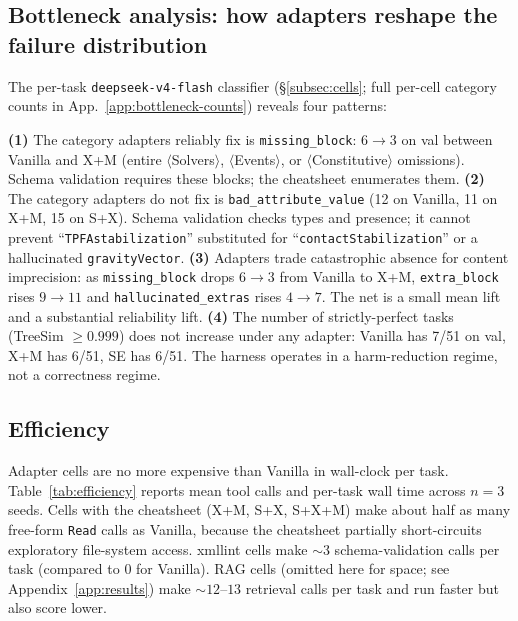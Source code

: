 \documentclass{article}
\begin{document}
\subsection{Bottleneck analysis: how adapters reshape the failure distribution}
\label{subsec:bottleneck-results}

The per-task \texttt{deepseek-v4-flash} classifier (\S\ref{subsec:cells}; full per-cell category counts in App.~\ref{app:bottleneck-counts}) reveals four patterns:

\textbf{(1)} The category adapters reliably fix is \texttt{missing\_block}: $6{\to}3$ on val between Vanilla and X+M (entire $\langle$Solvers$\rangle$, $\langle$Events$\rangle$, or $\langle$Constitutive$\rangle$ omissions). Schema validation requires these blocks; the cheatsheet enumerates them.
\textbf{(2)} The category adapters do not fix is \texttt{bad\_attribute\_value} (12 on Vanilla, 11 on X+M, 15 on S+X). Schema validation checks types and presence; it cannot prevent ``\texttt{TPFAstabilization}'' substituted for ``\texttt{contactStabilization}'' or a hallucinated \texttt{gravityVector}.
\textbf{(3)} Adapters trade catastrophic absence for content imprecision: as \texttt{missing\_block} drops $6{\to}3$ from Vanilla to X+M, \texttt{extra\_block} rises $9{\to}11$ and \texttt{hallucinated\_extras} rises $4{\to}7$. The net is a small mean lift and a substantial reliability lift.
\textbf{(4)} The number of strictly-perfect tasks (TreeSim $\geq 0.999$) does not increase under any adapter: Vanilla has 7/51 on val, X+M has 6/51, SE has 6/51. The harness operates in a harm-reduction regime, not a correctness regime.

\subsection{Efficiency}
\label{subsec:efficiency}

Adapter cells are no more expensive than Vanilla in wall-clock per task. Table~\ref{tab:efficiency} reports mean tool calls and per-task wall time across $n=3$ seeds. Cells with the cheatsheet (X+M, S+X, S+X+M) make about half as many free-form \texttt{Read} calls as Vanilla, because the cheatsheet partially short-circuits exploratory file-system access. xmllint cells make ${\sim}3$ schema-validation calls per task (compared to 0 for Vanilla). RAG cells (omitted here for space; see Appendix~\ref{app:results}) make ${\sim}12$--$13$ retrieval calls per task and run faster but also score lower.
\end{document}
